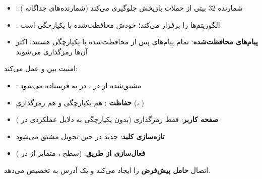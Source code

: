 \begin{itemize}
\tightlist
\item
  : شمارنده 32 بیتی از حملات بازپخش جلوگیری می‌کند (شمارنده‌های جداگانه )
\item
  : الگوریتم‌ها را برقرار می‌کند؛ خودش محافظت‌شده با یکپارچگی است
\item
  \textbf{پیام‌های محافظت‌شده}: تمام پیام‌های  پس از  محافظت‌شده با یکپارچگی هستند؛ اکثر آن‌ها رمزگذاری می‌شوند
\end{itemize}


امنیت  بین  و  عمل می‌کند:

\begin{itemize}
\tightlist
\item
  : مشتق‌شده از  در ، در  به  فرستاده می‌شود
\item
  \textbf{حفاظت }: هم یکپارچگی و هم رمزگذاری (، )
\item
  \textbf{صفحه کاربر}: فقط رمزگذاری (بدون یکپارچگی به دلایل عملکردی در )
\item
  \textbf{تازه‌سازی کلید}:  جدید در حین تحویل مشتق می‌شود 
\item
  \textbf{فعال‌سازی از طریق}:  (سطح ، متمایز از  در )
\end{itemize}



\CNchained{}

اتصال  \textbf{حامل پیش‌فرض } را ایجاد می‌کند و یک آدرس  به  تخصیص می‌دهد.


